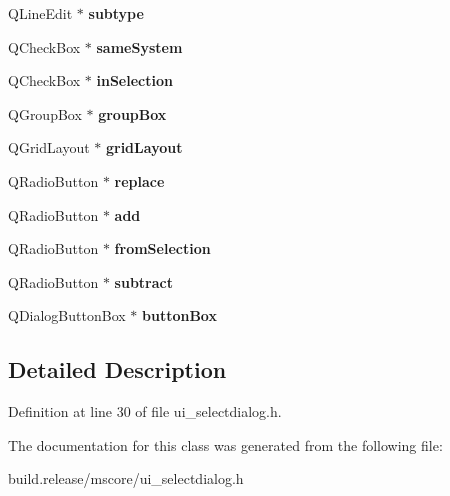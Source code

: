 \begin{DoxyCompactItemize}
Q\+Line\+Edit $\ast$ {\bfseries subtype}
\item 
\mbox{\label{class_ui___select_dialog_a57719893f399169855d4a58b9825f094}} 
Q\+Check\+Box $\ast$ {\bfseries same\+System}
\item 
\mbox{\label{class_ui___select_dialog_ae8c62e2c727482bf3dcf1a0c28b22b52}} 
Q\+Check\+Box $\ast$ {\bfseries in\+Selection}
\item 
\mbox{\label{class_ui___select_dialog_ab315e11ea8143acf89ddf3ac06515d23}} 
Q\+Group\+Box $\ast$ {\bfseries group\+Box}
\item 
\mbox{\label{class_ui___select_dialog_a3cf1cf97f7753d3202de934b5ee9bce9}} 
Q\+Grid\+Layout $\ast$ {\bfseries grid\+Layout}
\item 
\mbox{\label{class_ui___select_dialog_aff2efa8e45cbc029ba4a4f1529f15f19}} 
Q\+Radio\+Button $\ast$ {\bfseries replace}
\item 
\mbox{\label{class_ui___select_dialog_a7120314b0107e40689534940bab63bcc}} 
Q\+Radio\+Button $\ast$ {\bfseries add}
\item 
\mbox{\label{class_ui___select_dialog_a5a9bdc5b631e8907e3334673823ce250}} 
Q\+Radio\+Button $\ast$ {\bfseries from\+Selection}
\item 
\mbox{\label{class_ui___select_dialog_a598cf8f2e290ab84aa21ca9b9cf5ee31}} 
Q\+Radio\+Button $\ast$ {\bfseries subtract}
\item 
\mbox{\label{class_ui___select_dialog_a0be3e878ce93e1db65a7417f1e7d669b}} 
Q\+Dialog\+Button\+Box $\ast$ {\bfseries button\+Box}
\end{DoxyCompactItemize}


\subsection{Detailed Description}


Definition at line 30 of file ui\+\_\+selectdialog.\+h.



The documentation for this class was generated from the following file\+:\begin{DoxyCompactItemize}
\item 
build.\+release/mscore/ui\+\_\+selectdialog.\+h\end{DoxyCompactItemize}
